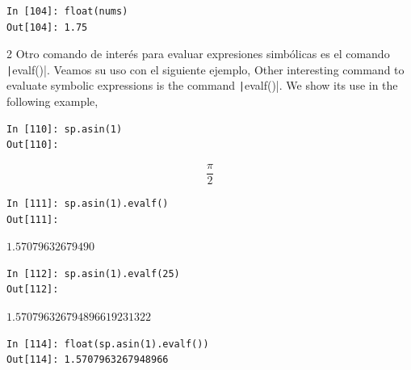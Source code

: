 \begin{center}
	\begin{minipage}{.5\textwidth}
		\begin{verbatim}
In [104]: float(nums)
Out[104]: 1.75
		\end{verbatim}
	\end{minipage}
\end{center}
\begin{paracol}{2}
Otro comando de interés para evaluar expresiones simbólicas es el comando \texttt|evalf()|. Veamos su uso con el siguiente ejemplo,
\switchcolumn
Other interesting command to evaluate symbolic expressions is the command \texttt|evalf()|. We show its use in the following example,
\end{paracol}

\begin{center}
	\begin{minipage}{.5\textwidth}
		\begin{verbatim}
In [110]: sp.asin(1)
Out[110]: 
\end{verbatim}
		\begin{equation*} \frac{\pi}{2}\end{equation*}
	\begin{verbatim}
In [111]: sp.asin(1).evalf()
Out[111]: 
\end{verbatim}
$1.57079632679490$
	\begin{verbatim}
In [112]: sp.asin(1).evalf(25)
Out[112]:
\end{verbatim}
$1.570796326794896619231322$
	\begin{verbatim}
In [114]: float(sp.asin(1).evalf())
Out[114]: 1.5707963267948966
\end{verbatim}
\end{minipage}
\end{center}
